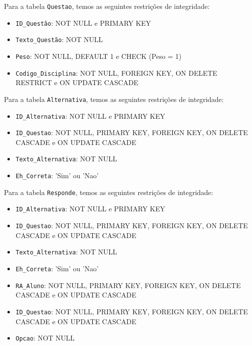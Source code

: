 \documentclass[12pt,a4paper]{article}
\begin{document}
\vspace{0.5cm}
Para a tabela \texttt{Questao}, temos as seguintes restrições de integridade:

\begin{itemize}
    \item \texttt{ID\_Questão}: NOT NULL e PRIMARY KEY
    \item \texttt{Texto\_Questão}: NOT NULL
    \item \texttt{Peso}: NOT NULL, DEFAULT 1 e CHECK (Peso = 1)
    \item \texttt{Codigo\_Disciplina}: NOT NULL, FOREIGN KEY, ON DELETE RESTRICT e ON UPDATE CASCADE
\end{itemize}

\vspace{0.5cm}
Para a tabela \texttt{Alternativa}, temos as seguintes restrições de integridade:

\begin{itemize}
    \item \texttt{ID\_Alternativa}: NOT NULL e PRIMARY KEY
    \item \texttt{ID\_Questao}: NOT NULL, PRIMARY KEY, FOREIGN KEY, ON DELETE CASCADE e ON UPDATE CASCADE
    \item \texttt{Texto\_Alternativa}: NOT NULL
    \item \texttt{Eh\_Correta}: 'Sim' ou 'Nao'
\end{itemize}

\vspace{0.5cm}
Para a tabela \texttt{Responde}, temos as seguintes restrições de integridade:

\begin{itemize}
    \item \texttt{ID\_Alternativa}: NOT NULL e PRIMARY KEY
    \item \texttt{ID\_Questao}: NOT NULL, PRIMARY KEY, FOREIGN KEY, ON DELETE CASCADE e ON UPDATE CASCADE
    \item \texttt{Texto\_Alternativa}: NOT NULL
    \item \texttt{Eh\_Correta}: 'Sim' ou 'Nao'
\end{itemize}

\vspace{0.5cm}
\begin{itemize}
    \item \texttt{RA\_Aluno}: NOT NULL, PRIMARY KEY, FOREIGN KEY, ON DELETE CASCADE e ON UPDATE CASCADE
    \item \texttt{ID\_Questao}: NOT NULL, PRIMARY KEY, FOREIGN KEY, ON DELETE CASCADE e ON UPDATE CASCADE
    \item \texttt{Opcao}: NOT NULL
\end{itemize}
\vspace{0.5cm}
\end{document}
